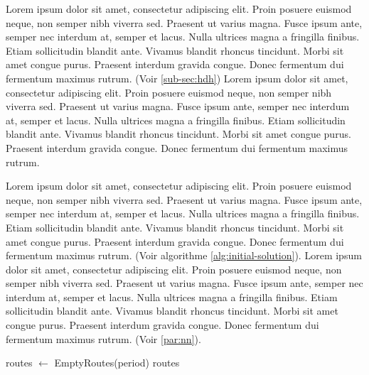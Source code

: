 \medskip
Lorem ipsum dolor sit amet, consectetur adipiscing elit. Proin posuere euismod neque, non semper nibh viverra sed. Praesent ut varius magna. Fusce ipsum ante, semper nec interdum at, semper et lacus. Nulla ultrices magna a fringilla finibus. Etiam sollicitudin blandit ante. Vivamus blandit rhoncus tincidunt. Morbi sit amet congue purus. Praesent interdum gravida congue. Donec fermentum dui fermentum maximus rutrum. \parencite{hemmelmayr_variable_2009} (Voir \ref{sub-sec:hdh}) Lorem ipsum dolor sit amet, consectetur adipiscing elit. Proin posuere euismod neque, non semper nibh viverra sed. Praesent ut varius magna. Fusce ipsum ante, semper nec interdum at, semper et lacus. Nulla ultrices magna a fringilla finibus. Etiam sollicitudin blandit ante. Vivamus blandit rhoncus tincidunt. Morbi sit amet congue purus. Praesent interdum gravida congue. Donec fermentum dui fermentum maximus rutrum.

Lorem ipsum dolor sit amet, consectetur adipiscing elit. Proin posuere euismod neque, non semper nibh viverra sed. Praesent ut varius magna. Fusce ipsum ante, semper nec interdum at, semper et lacus. Nulla ultrices magna a fringilla finibus. Etiam sollicitudin blandit ante. Vivamus blandit rhoncus tincidunt. Morbi sit amet congue purus. Praesent interdum gravida congue. Donec fermentum dui fermentum maximus rutrum. (Voir algorithme \ref{alg:initial-solution}). Lorem ipsum dolor sit amet, consectetur adipiscing elit. Proin posuere euismod neque, non semper nibh viverra sed. Praesent ut varius magna. Fusce ipsum ante, semper nec interdum at, semper et lacus. Nulla ultrices magna a fringilla finibus. Etiam sollicitudin blandit ante. Vivamus blandit rhoncus tincidunt. Morbi sit amet congue purus. Praesent interdum gravida congue. Donec fermentum dui fermentum maximus rutrum. (Voir \ref{par:nn}).

\medskip

\begin{algorithm2e}[H]
  routes $\gets$ EmptyRoutes(period) \;
  \Return routes \;
  \caption{Initial Solution}
  \label{alg:initial-solution}
\end{algorithm2e}
\FloatBarrier

